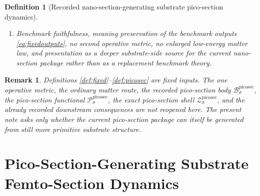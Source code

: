 \documentclass[11pt]{article}
\newcommand{\NanoSectionShell}[1]{\mathcal Z_{#1}^{\mathrm{nanosec}}}
\newcommand{\PicoSectionBody}[1]{\mathcal B_{#1}^{\mathrm{picosec}}}
\newcommand{\PicoSectionProj}[1]{\Pi_{#1}^{\mathrm{picosec}}}
\newcommand{\PicoSectionFiber}[2]{\mathcal F_{#1}^{\mathrm{picosec}}(#2)}
\newcommand{\PicoSectionFunctional}[1]{\mathscr P_{#1}^{\mathrm{picosec}}}
\newcommand{\PicoSectionShell}[1]{\mathcal Z_{#1}^{\mathrm{picosec}}}
\newtheorem{definition}{Definition}
\newtheorem{remark}{Remark}
\begin{document}
\begin{definition}[Recorded nano-section-generating substrate pico-section dynamics]
\begin{enumerate}
\[\begin{array}{l}
    \PicoSectionFunctional{\sigma}(r)
    =
    \displaystyle\min_{s\in\PicoSectionFiber{\sigma}{\PicoSectionProj{\sigma}(r)}}
    \PicoSectionFunctional{\sigma}(s)
    \end{array}
    \right\},
    \]
    and
    \[
    \PicoSectionProj{\sigma}\big|_{\PicoSectionShell{\sigma}}
    :
    \PicoSectionShell{\sigma}
    \xrightarrow{\cong}
    \NanoSectionShell{\sigma}
    \]
    is a diffeomorphism.
    \item Benchmark faithfulness, meaning preservation of the benchmark outputs \eqref{eq:fixedoutputs}, no second operative metric, no enlarged low-energy matter law, and presentation as a deeper substrate-side source for the current nano-section package rather than as a replacement benchmark theory.
\end{enumerate}
\end{definition}

\begin{remark}
Definitions \ref{def:fixed}--\ref{def:picosec} are fixed inputs. The one operative metric, the ordinary matter route, the recorded pico-section body \(\PicoSectionBody{\sigma}\), the pico-section functional \(\PicoSectionFunctional{\sigma}\), the exact pico-section shell \(\PicoSectionShell{\sigma}\), and the already recorded downstream consequences are not reopened here. The present note asks only whether the current pico-section package can itself be generated from still more primitive substrate structure.
\end{remark}

\section{Pico-Section-Generating Substrate Femto-Section Dynamics}
\end{document}
